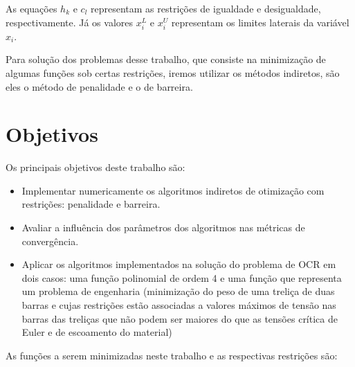 \documentclass[10pt, a4paper]{article}
\begin{document}
As equa\c c\~oes $h_k$ e $c_l$ representam as restri\c c\~oes de igualdade e desigualdade, respectivamente. J\'a os valores $x_i^L$ e $x_i^U$ representam os limites laterais da vari\'avel $x_i$.

Para solu\c c\~ao dos problemas desse trabalho, que consiste na minimiza\c c\~ao de algumas fun\c c\~oes sob certas restri\c c\~oes, iremos utilizar os m\'etodos indiretos, s\~ao eles o m\'etodo de penalidade e o de barreira.

\section{Objetivos}

Os principais objetivos deste trabalho s\~ao:
\begin{itemize}
      \item Implementar numericamente os algoritmos indiretos de otimiza\c c\~ao com restri\c c\~oes: penalidade e barreira.
      \item Avaliar a influ\^encia dos par\^ametros dos algoritmos nas m\'etricas de converg\^encia.
      \item Aplicar os algoritmos implementados na solu\c c\~ao do problema de OCR em dois casos: uma fun\c c\~ao polinomial de ordem 4 e uma fun\c c\~ao que representa um problema de engenharia (minimiza\c c\~ao do peso de uma treli\c ca de duas barras e cujas restri\c c\~oes est\~ao associadas a valores m\'aximos de tens\~ao nas barras das treli\c cas que n\~ao podem ser maiores do que as tens\~oes cr\'itica de Euler e de escoamento do material)
\end{itemize}

As fun\c c\~oes a serem minimizadas neste trabalho e as respectivas restri\c c\~oes s\~ao:
\end{document}
